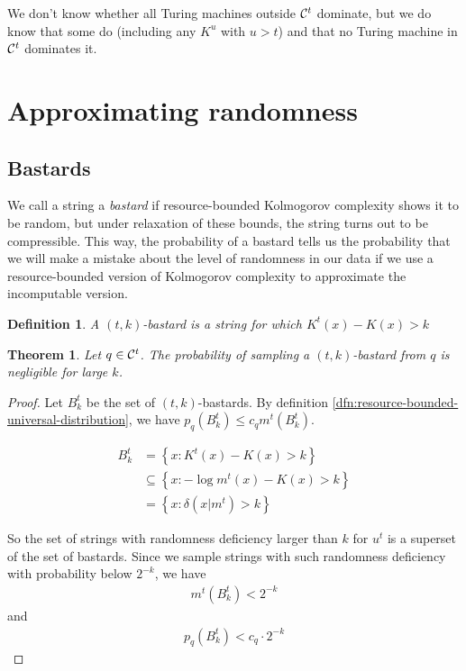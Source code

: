 \documentclass[10pt,a4paper,oneside]{article}
\newtheorem{thm}{Theorem}
\newtheorem{dfn}{Definition}
\begin{document}
We don't know whether all Turing machines outside ${\cal C}^t$ dominate, but we do know that some do (including any $K^u$ with $u > t$) and that no Turing machine in ${\cal C}^t$ dominates it. 

\section*{Approximating randomness}

\subsection*{Bastards}

We call a string a \emph{bastard} if resource-bounded Kolmogorov complexity shows it to be random, but under relaxation of these bounds, the string turns out to be compressible. This way, the probability of a bastard tells us the probability that we will make a mistake about the level of randomness in our data if we use a resource-bounded version of Kolmogorov complexity to approximate the incomputable version.

\begin{dfn}
A \emph{$(t, k)$-bastard} is a string for which $K^t(x) - K(x) > k$
\end{dfn}

\begin{thm}
Let $q \in {\cal C}^t$. The probability of sampling a $(t, k)$-bastard from $q$ is negligible for large $k$.
\end{thm}
\begin{proof}

Let $B^t_k$ be the set of $(t, k)$-bastards. By definition \ref{dfn:resource-bounded-universal-distribution}, we have $p_q(B^t_k) \leq c_q m^t(B^t_k)$.

\begin{align*}
B^t_k &= \left\{x : K^t(x) - K(x) > k\right\} \\ 
	&\subseteq \left\{x : - \log m^t(x) - K(x) > k\right\} \\
	&= \left\{x : \delta(x | m^t) > k\right\}
\end{align*}

So the set of strings with randomness deficiency larger than $k$ for $u^t$ is a superset of the set of bastards. Since we sample strings with such randomness deficiency with probability below $2^{-k}$, we have
\begin{align*}
m^t\left(B^t_k\right) < 2^{-k} 
\end{align*}
and 
\begin{align*}
p_q\left(B^t_k\right) < c_q \cdot 2^{-k} 
\end{align*}
\end{proof}
\end{document}
